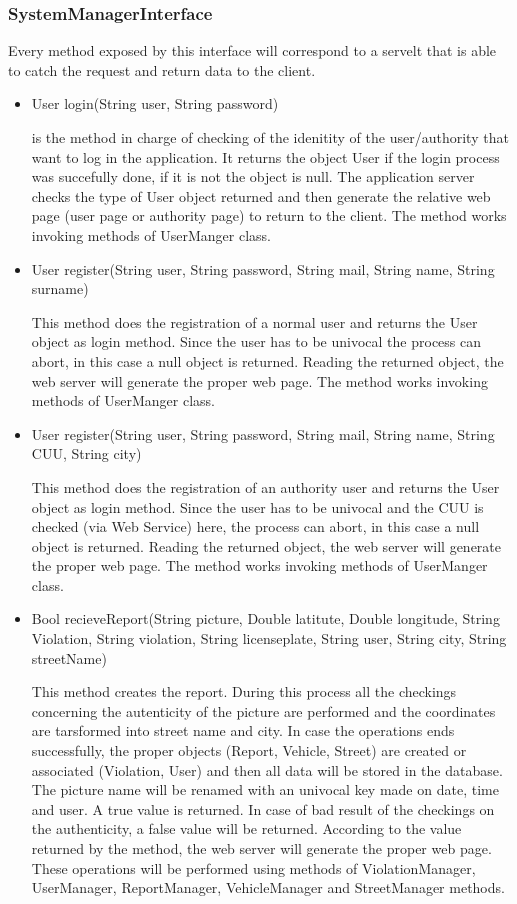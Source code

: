 \subsubsection{SystemManagerInterface}
Every method exposed by this interface will correspond to a servelt that is able to catch the request and return data to the client.
\begin{itemize}
	\item 
	User login(String user, String password)
	
	is the method in charge of checking of the idenitity of the user/authority that want to log in the application. It returns the object User if the login process was succefully done, if it is not the object is null. The application server checks the type of User object returned and then generate the relative web page (user page or authority page) to return to the client.
	The method works invoking methods of UserManger class.
	
	\item 
	User register(String user, String password, String mail, String name, String surname)
	
	This method does the registration of a normal user and returns the User object as login method. Since the user has to be univocal the process can abort, in this case a null object is returned.
	Reading the returned object, the web server will generate the proper web page.
	The method works invoking methods of UserManger class.
	
	\item 
	User register(String user, String password, String mail, String name, String CUU, String city)
	
	This method does the registration of an authority user and returns the User object as login method. Since the user has to be univocal and the CUU is checked (via Web Service) here, the process can abort, in this case a null object is returned.
	Reading the returned object, the web server will generate the proper web page.
	The method works invoking methods of UserManger class.
	
	\item
	 Bool recieveReport(String picture, Double latitute, Double longitude, String Violation, String violation, String licenseplate, String user, String city, String streetName)
	 
	 This method creates the report. During this process all the checkings concerning the autenticity of the picture are performed and the coordinates are tarsformed into street name and city. In case the operations ends successfully, the proper objects (Report, Vehicle, Street) are created or associated (Violation, User) and then all data will be stored in the database. The picture name will be renamed with an univocal key made on date, time and user. A true value is returned.
	 In case of bad result of the checkings on the authenticity, a false value will be returned.
	 According to the value returned by the method, the web server will generate the proper web page.
	 These operations will be performed using methods of ViolationManager, UserManager, ReportManager, VehicleManager and  StreetManager methods.
	 

\end{itemize}
